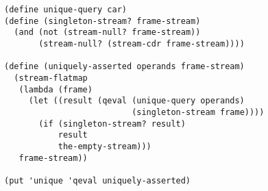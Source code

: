 \documentclass[a4paper,12pt]{article}
\begin{document}
\begin{lstlisting}
(define unique-query car)
(define (singleton-stream? frame-stream)
  (and (not (stream-null? frame-stream))
       (stream-null? (stream-cdr frame-stream))))

(define (uniquely-asserted operands frame-stream)
  (stream-flatmap
   (lambda (frame)
     (let ((result (qeval (unique-query operands)
                          (singleton-stream frame))))
       (if (singleton-stream? result)
           result
           the-empty-stream)))
   frame-stream))

(put 'unique 'qeval uniquely-asserted)
\end{lstlisting}
\end{document}
